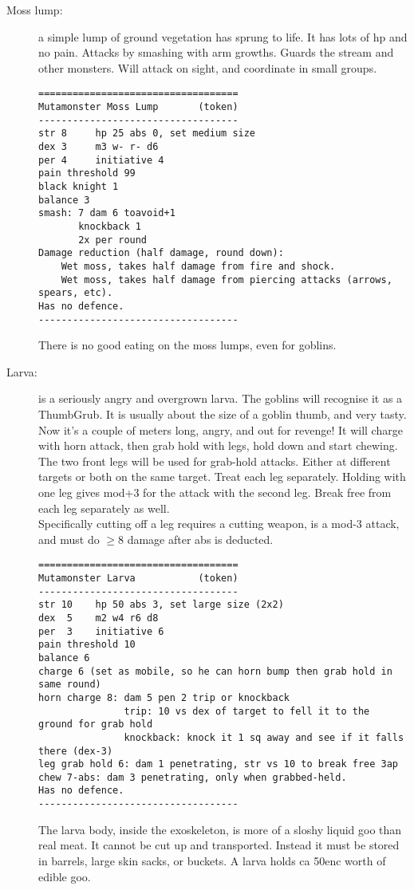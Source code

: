\begin{description}
\item[Moss lump:] a simple lump of ground vegetation has sprung to life. It has lots of hp and no pain. Attacks by smashing with arm growths. Guards the stream and other monsters. Will attack on sight, and coordinate in small groups.
\goodbreak \begin{samepage} \small \begin{verbatim}
===================================
Mutamonster Moss Lump       (token)
-----------------------------------
str 8     hp 25 abs 0, set medium size
dex 3     m3 w- r- d6
per 4     initiative 4
pain threshold 99
black knight 1
balance 3
smash: 7 dam 6 toavoid+1
       knockback 1
       2x per round
Damage reduction (half damage, round down):
    Wet moss, takes half damage from fire and shock.
    Wet moss, takes half damage from piercing attacks (arrows, spears, etc).
Has no defence.
-----------------------------------
\end{verbatim} \normalsize \end{samepage}
There is no good eating on the moss lumps, even for goblins.


\item[Larva:] is a seriously angry and overgrown larva. The goblins will recognise it as a ThumbGrub. It is usually about the size of a goblin thumb, and very tasty. Now it's a couple of meters long, angry, and out for revenge!
It will charge with horn attack, then grab hold with legs, hold down and start chewing. The two front legs will be used for grab-hold attacks. Either at different targets or both on the same target. Treat each leg separately. Holding with one leg gives mod+3 for the attack with the second leg. Break free from each leg separately as well.\\
Specifically cutting off a leg requires a cutting weapon, is a mod-3 attack, and must do $\geq$8 damage after abs is deducted.
\goodbreak \begin{samepage} \small \begin{verbatim}
===================================
Mutamonster Larva           (token)
-----------------------------------
str 10    hp 50 abs 3, set large size (2x2)
dex  5    m2 w4 r6 d8
per  3    initiative 6
pain threshold 10
balance 6
charge 6 (set as mobile, so he can horn bump then grab hold in same round)
horn charge 8: dam 5 pen 2 trip or knockback
               trip: 10 vs dex of target to fell it to the ground for grab hold
               knockback: knock it 1 sq away and see if it falls there (dex-3)
leg grab hold 6: dam 1 penetrating, str vs 10 to break free 3ap
chew 7-abs: dam 3 penetrating, only when grabbed-held.
Has no defence.
-----------------------------------
\end{verbatim} \normalsize \end{samepage}
The larva body, inside the exoskeleton, is more of a sloshy liquid goo than real meat. It cannot be cut up and transported. Instead it must be stored in barrels, large skin sacks, or buckets. A larva holds ca 50enc worth of edible goo.



\end{description}

